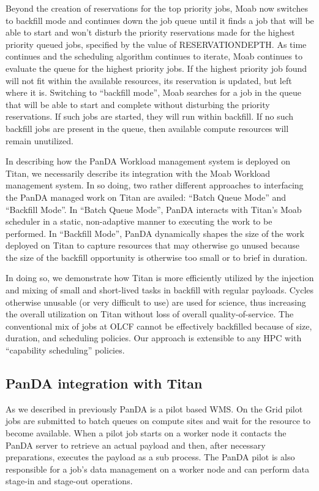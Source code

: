 Beyond the creation of reservations for the top priority jobs, Moab now
switches to backfill mode and continues down the job queue until it finds a job
that will be able to start and won't disturb the priority reservations made for
the highest priority queued jobs, specified by the value of RESERVATIONDEPTH.
As time continues and the scheduling algorithm continues to iterate, Moab
continues to evaluate the queue for the highest priority jobs. If the highest
priority job found will not fit within the available resources, its reservation
is updated, but left where it is. Switching to ``backfill mode'', Moab searches
for a job in the queue that will be able to start and complete without
disturbing the priority reservations.  If such jobs are started, they will run
within backfill.  If no such backfill jobs are present in the queue, then
available compute resources will remain unutilized.

In describing how the PanDA Workload management system is deployed on Titan, we
necessarily describe its integration with the Moab Workload management system.
In so doing, two rather different approaches to interfacing the PanDA managed
work on Titan are availed: ``Batch Queue Mode'' and ``Backfill Mode''.  In
``Batch Queue Mode'', PanDA interacts with Titan's Moab scheduler in a static,
non-adaptive manner to executing the work to be performed.  In ``Backfill
Mode'', PanDA  dynamically shapes the size of the work deployed on Titan to
capture resources that may otherwise go unused because the size of the backfill
opportunity is otherwise too small or to brief in duration.

In doing so, we demonstrate how Titan is more efficiently utilized by the
injection and mixing of small and short-lived tasks in backfill with regular
payloads. Cycles otherwise unusable (or very difficult to use) are used for
science, thus increasing the overall utilization on Titan without loss of
overall quality-of-service. The conventional mix of jobs at OLCF cannot be
effectively backfilled because of size, duration, and scheduling policies. Our
approach is extensible to any HPC with ``capability scheduling'' policies. 

\subsection{PanDA integration with Titan}
\label{subsec:integration}

As we described in previously PanDA is a pilot based WMS. On the Grid pilot
jobs are submitted to batch queues on compute sites and wait for the resource
to become available. When a pilot job starts on a worker node it contacts the
PanDA server to retrieve an actual payload and then, after necessary
preparations, executes the payload as a sub process. The PanDA pilot is also
responsible for a job's data management on a worker node and can perform data
stage-in and stage-out operations. 

